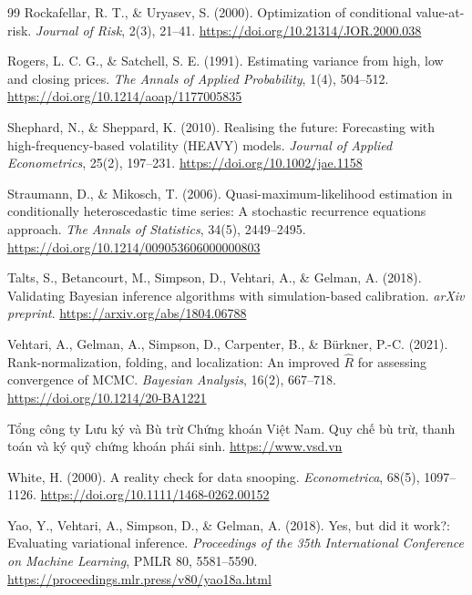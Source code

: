 \documentclass[12pt,a4paper]{article}
\theoremstyle{definition}
\theoremstyle{remark}
\begin{document}
\begin{thebibliography}{99}
 Rockafellar, R. T., \& Uryasev, S. (2000). Optimization of conditional value-at-risk. \emph{Journal of Risk}, 2(3), 21--41. \url{https://doi.org/10.21314/JOR.2000.038}

 Rogers, L. C. G., \& Satchell, S. E. (1991). Estimating variance from high, low and closing prices. \emph{The Annals of Applied Probability}, 1(4), 504--512. \url{https://doi.org/10.1214/aoap/1177005835}

 Shephard, N., \& Sheppard, K. (2010). Realising the future: Forecasting with high-frequency-based volatility (HEAVY) models. \emph{Journal of Applied Econometrics}, 25(2), 197--231. \url{https://doi.org/10.1002/jae.1158}

 Straumann, D., \& Mikosch, T. (2006). Quasi-maximum-likelihood estimation in conditionally heteroscedastic time series: A stochastic recurrence equations approach. \emph{The Annals of Statistics}, 34(5), 2449--2495. \url{https://doi.org/10.1214/009053606000000803}

 Talts, S., Betancourt, M., Simpson, D., Vehtari, A., \& Gelman, A. (2018). Validating Bayesian inference algorithms with simulation-based calibration. \emph{arXiv preprint}. \url{https://arxiv.org/abs/1804.06788}

 Vehtari, A., Gelman, A., Simpson, D., Carpenter, B., \& Bürkner, P.-C. (2021). Rank-normalization, folding, and localization: An improved $\widehat R$ for assessing convergence of MCMC. \emph{Bayesian Analysis}, 16(2), 667--718. \url{https://doi.org/10.1214/20-BA1221}

 Tổng công ty Lưu ký và Bù trừ Chứng khoán Việt Nam. Quy chế bù trừ, thanh toán và ký quỹ chứng khoán phái sinh. \url{https://www.vsd.vn}

 White, H. (2000). A reality check for data snooping. \emph{Econometrica}, 68(5), 1097--1126. \url{https://doi.org/10.1111/1468-0262.00152}

 Yao, Y., Vehtari, A., Simpson, D., \& Gelman, A. (2018). Yes, but did it work?: Evaluating variational inference. \emph{Proceedings of the 35th International Conference on Machine Learning}, PMLR 80, 5581--5590. \url{https://proceedings.mlr.press/v80/yao18a.html}

\end{thebibliography}
\end{document}
